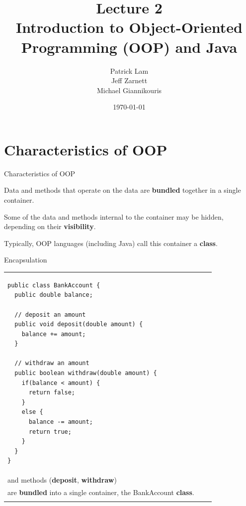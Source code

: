 \documentclass{beamer}
\title{Lecture 2 \\ Introduction to Object-Oriented Programming (OOP) and Java}
\date{\today}
\author{Patrick Lam \\ Jeff Zarnett \\ Michael Giannikouris}
\institute{Department of Electrical and Computer Engineering}
\newenvironment{deflist}
{ \begin{description}
    \setlength{\itemsep}{6pt}
    \setlength{\parskip}{0pt}
    \setlength{\parsep}{0pt}     }
{ \end{description}                  }
\begin{document}
\maketitle

\section{Characteristics of OOP}

\begin{frame}{Characteristics of OOP}
	\begin{deflist}
		\item[Encapsulation]
		Data and methods that operate on the data are \textbf{bundled} together in a single container.	
		\item Some of the data and methods internal to the container may be hidden, depending on their \textbf{visibility}.
		\item[] Typically, OOP languages (including Java) call this container a \textbf{class}.
	\end{deflist}
\end{frame}



\begin{frame}[fragile]{Encapsulation}

\centering
\begin{tabular}{@{}m{} | m{}@{} m{}@{}}

\begin{Verbatim}[fontsize=\tiny]
public class BankAccount {
  public double balance;
  
  // deposit an amount
  public void deposit(double amount) {
    balance += amount;
  }
  
  // withdraw an amount
  public boolean withdraw(double amount) {
    if(balance < amount) {
      return false;
    }
    else {
      balance -= amount;
      return true;
    }
  }
}
\end{Verbatim}

&&

\raggedright
\begin{footnotesize}
Data (\textbf{balance}) 	\\
and methods (\textbf{deposit}, \textbf{withdraw})	\\
are \textbf{bundled} into a single container, the BankAccount \textbf{class}. \\
\end{footnotesize}

\end{tabular}

\end{frame}
\end{document}
